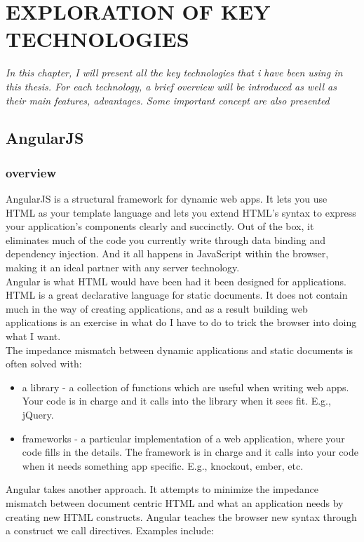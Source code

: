 \documentclass[14pt,a4paper]{extreport}
\begin{document}
\chapter{EXPLORATION OF KEY TECHNOLOGIES}
\textsl{In this chapter, I will present all the key technologies that i have been using in this thesis. For each technology, a brief overview will be introduced as well as their main features, advantages. Some important concept are also presented}
\newpage

	\section{AngularJS}
		\subsection{overview}
		AngularJS is a structural framework for dynamic web apps. It lets you use HTML as your template language and lets you extend HTML's syntax to express your application's components clearly and succinctly. Out of the box, it eliminates much of the code you currently write through data binding and dependency injection. And it all happens in JavaScript within the browser, making it an ideal partner with any server technology.
\\		

Angular is what HTML would have been had it been designed for applications. HTML is a great declarative language for static documents. It does not contain much in the way of creating applications, and as a result building web applications is an exercise in what do I have to do to trick the browser into doing what I want.
\\

The impedance mismatch between dynamic applications and static documents is often solved with:
\begin{itemize}
\item a library - a collection of functions which are useful when writing web apps. Your code is in charge and it calls into the library when it sees fit. E.g., jQuery.
\item frameworks - a particular implementation of a web application, where your code fills in the details. The framework is in charge and it calls into your code when it needs something app specific. E.g., knockout, ember, etc.

\end{itemize}


Angular takes another approach. It attempts to minimize the impedance mismatch between document centric HTML and what an application needs by creating new HTML constructs. Angular teaches the browser new syntax through a construct we call directives. Examples include:
\end{document}
